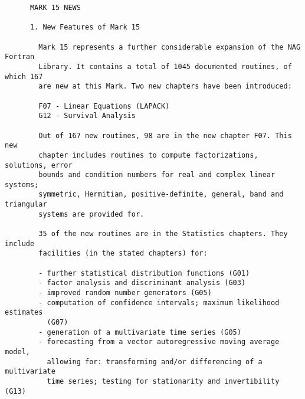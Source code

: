 \begin{small}
\begin{verbatim}
      MARK 15 NEWS                                                               
                                                                                 
      1. New Features of Mark 15                                                 
                                                                                 
        Mark 15 represents a further considerable expansion of the NAG Fortran   
        Library. It contains a total of 1045 documented routines, of which 167   
        are new at this Mark. Two new chapters have been introduced:             
                                                                                 
        F07 - Linear Equations (LAPACK)                                          
        G12 - Survival Analysis                                                  
                                                                                 
        Out of 167 new routines, 98 are in the new chapter F07. This new         
        chapter includes routines to compute factorizations, solutions, error    
        bounds and condition numbers for real and complex linear systems;        
        symmetric, Hermitian, positive-definite, general, band and triangular    
        systems are provided for.                                                
                                                                                 
        35 of the new routines are in the Statistics chapters. They include      
        facilities (in the stated chapters) for:                                 
                                                                                 
        - further statistical distribution functions (G01)                       
        - factor analysis and discriminant analysis (G03)                        
        - improved random number generators (G05)                                
        - computation of confidence intervals; maximum likelihood estimates      
          (G07)                                                                  
        - generation of a multivariate time series (G05)                         
        - forecasting from a vector autoregressive moving average model,         
          allowing for: transforming and/or differencing of a multivariate       
          time series; testing for stationarity and invertibility (G13)          
                                                                                 

\end{verbatim}
\end{small}
